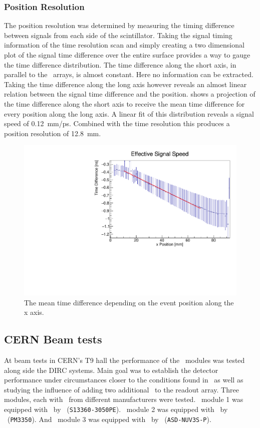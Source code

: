 \documentclass[../BTOF_summary.tex]{subfiles}
\begin{document}
\subsubsection*{Position Resolution}

The position resolution was determined by measuring the timing difference between signals from each side of the scintillator.
Taking the signal timing information of the time resolution scan and simply creating a two dimensional plot of the signal time difference over the entire surface provides a way to gauge the time difference distribution.
The time difference along the short axis, in parallel to the \sipm\ arrays, is almost constant.
Here no information can be extracted.
Taking the time difference along the long axis however reveals an almost linear relation between the signal time difference and the position.
\fig shows a projection of the time difference along the short axis to receive the mean time difference for every position along the long axis.
A linear fit of this distribution reveals a signal speed of \SI{0.12}{mm/ps}.
Combined with the time resolution this produces a position resolution of \SI{12.8}{mm}.

\begin{figure}[htbp]
    \centering
    \includegraphics[width=.7\textwidth]{fig/run51_EffectiveSpeed.pdf}
    \caption{The mean time difference depending on the event position along the x axis.}
    \label{fig:positionRes}
\end{figure}

\subsection{CERN Beam tests}

At beam tests in CERN's T9 hall the performance of the \btof\ modules was tested along side the DIRC systems.
Main goal was to establish the detector performance under circumstances closer to the conditions found in \panda\ as well as  studying the influence of adding two additional \sipms\ to the readout array.
Three modules, each with \sipms\ from different manufacturers were tested.
\btof\ module 1 was equipped with \sipms\ by \hamamatsu~(\texttt{S13360-3050PE}).
\btof\ module 2 was equipped with \sipms\ by \ketek~(\texttt{PM3350}).
And \btof\ module 3 was equipped with \sipms\ by \advansid~(\texttt{ASD-NUV3S-P}).
\end{document}
